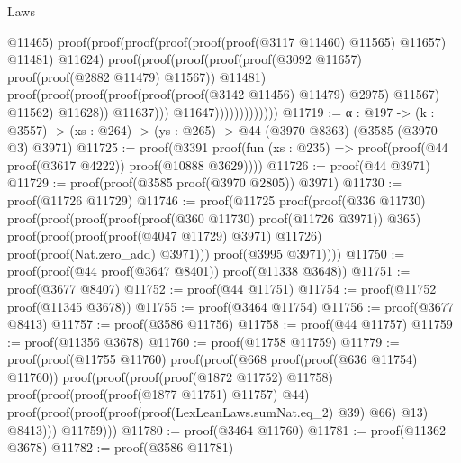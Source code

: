 \begin{lexlean}{Laws}
\begin{coremodule}
                                            @11465)
                                          proof(proof(proof(proof(proof(proof(@3117 @11460) @11565)
                                                    @11657)
                                                  @11481)
                                                @11624)
                                              proof(proof(proof(proof(proof(@3092 @11657)
                                                        proof(proof(@2882 @11479) @11567))
                                                      @11481)
                                                    proof(proof(proof(proof(proof(proof(@3142
                                                                  @11456)
                                                                @11479)
                                                              @2975)
                                                            @11567)
                                                          @11562)
                                                        @11628))
                                                  @11637)))
                                        @11647)))))))))))))
@11719 := {α : @197} ->
  (k : @3557) -> (xs : @264) -> (ys : @265) -> @44 (@3970 @8363) (@3585 (@3970 @3) @3971)
@11725 := proof(@3391
      proof(fun (xs : @235) => proof(proof(@44 proof(@3617 @4222)) proof(@10888 @3629))))
@11726 := proof(@44 @3971)
@11729 := proof(proof(@3585 proof(@3970 @2805)) @3971)
@11730 := proof(@11726 @11729)
@11746 := proof(@11725
      proof(proof(@336 @11730)
          proof(proof(proof(proof(proof(@360 @11730) proof(@11726 @3971)) @365)
                proof(proof(proof(proof(@4047 @11729) @3971) @11726)
                    proof(proof(Nat.zero_add) @3971)))
              proof(@3995 @3971))))
@11750 := proof(proof(@44 proof(@3647 @8401)) proof(@11338 @3648))
@11751 := proof(@3677 @8407)
@11752 := proof(@44 @11751)
@11754 := proof(@11752 proof(@11345 @3678))
@11755 := proof(@3464 @11754)
@11756 := proof(@3677 @8413)
@11757 := proof(@3586 @11756)
@11758 := proof(@44 @11757)
@11759 := proof(@11356 @3678)
@11760 := proof(@11758 @11759)
@11779 := proof(proof(@11755 @11760)
      proof(proof(@668 proof(proof(@636 @11754) @11760))
          proof(proof(proof(proof(@1872 @11752) @11758)
                proof(proof(proof(proof(@1877 @11751) @11757) @44)
                    proof(proof(proof(proof(proof(LexLeanLaws.sumNat.eq_2) @39) @66) @13) @8413)))
              @11759)))
@11780 := proof(@3464 @11760)
@11781 := proof(@11362 @3678)
@11782 := proof(@3586 @11781)

\end{coremodule}
\end{lexlean}
